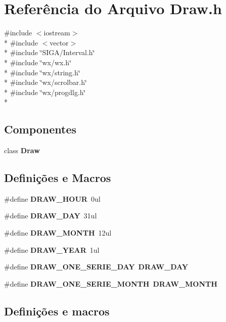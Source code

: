 \section{Referência do Arquivo Draw.\+h}
\label{_draw_8h}
{\ttfamily \#include $<$iostream$>$}\\*
{\ttfamily \#include $<$vector$>$}\\*
{\ttfamily \#include \char`\"{}S\+I\+G\+A/\+Interval.\+h\char`\"{}}\\*
{\ttfamily \#include \char`\"{}wx/wx.\+h\char`\"{}}\\*
{\ttfamily \#include \char`\"{}wx/string.\+h\char`\"{}}\\*
{\ttfamily \#include \char`\"{}wx/scrolbar.\+h\char`\"{}}\\*
{\ttfamily \#include \char`\"{}wx/progdlg.\+h\char`\"{}}\\*
\subsection*{Componentes}
\begin{DoxyCompactItemize}
\item 
class {\bf Draw}
\end{DoxyCompactItemize}
\subsection*{Definições e Macros}
\begin{DoxyCompactItemize}
\item 
\#define {\bf D\+R\+A\+W\+\_\+\+H\+O\+UR}~0ul
\item 
\#define {\bf D\+R\+A\+W\+\_\+\+D\+AY}~31ul
\item 
\#define {\bf D\+R\+A\+W\+\_\+\+M\+O\+N\+TH}~12ul
\item 
\#define {\bf D\+R\+A\+W\+\_\+\+Y\+E\+AR}~1ul
\item 
\#define {\bf D\+R\+A\+W\+\_\+\+O\+N\+E\+\_\+\+S\+E\+R\+I\+E\+\_\+\+D\+AY}~{\bf D\+R\+A\+W\+\_\+\+D\+AY}
\item 
\#define {\bf D\+R\+A\+W\+\_\+\+O\+N\+E\+\_\+\+S\+E\+R\+I\+E\+\_\+\+M\+O\+N\+TH}~{\bf D\+R\+A\+W\+\_\+\+M\+O\+N\+TH}
\end{DoxyCompactItemize}


\subsection{Definições e macros}
